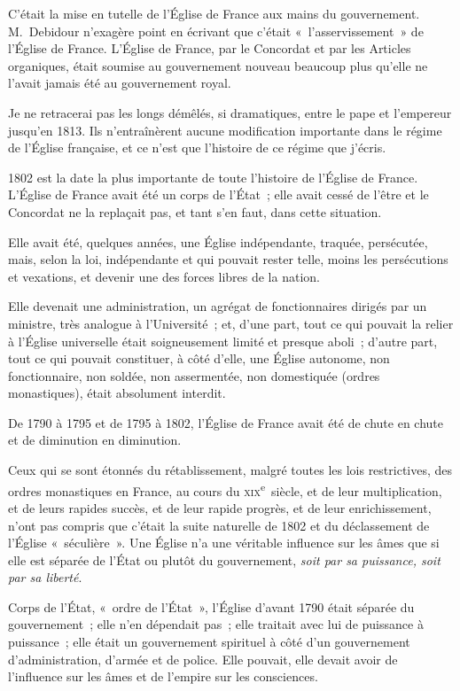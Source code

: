 \documentclass[french,twoside]{book} %
\begin{document}
C’était la mise en tutelle de l’Église de France aux mains du gouvernement. M. Debidour n’exagère point en écrivant que c’était « l’asservissement » de l’Église de France. L’Église de France, par le Concordat et par les Articles organiques, était soumise au gouvernement nouveau beaucoup plus qu’elle ne l’avait jamais été au gouvernement royal.\par
 Je ne retracerai pas les longs démêlés, si dramatiques, entre le pape et l’empereur jusqu’en 1813. Ils n’entraînèrent aucune modification importante dans le régime de l’Église française, et ce n’est que l’histoire de ce régime que j’écris.\par
1802 est la date la plus importante de toute l’histoire de l’Église de France. L’Église de France avait été un corps de l’État ; elle avait cessé de l’être et le Concordat ne la replaçait pas, et tant s’en faut, dans cette situation.\par
Elle avait été, quelques années, une Église indépendante, traquée, persécutée, mais, selon la loi, indépendante et qui pouvait rester telle, moins les persécutions et vexations, et devenir une des forces libres de la nation.\par
Elle devenait une administration, un agrégat de fonctionnaires dirigés par un ministre, très analogue à l’Université ; et, d’une part, tout ce qui pouvait la relier à l’Église universelle était soigneusement limité et presque aboli ; d’autre part, tout ce qui pouvait constituer, à côté d’elle, une Église autonome, non fonctionnaire, non soldée, non assermentée, non domestiquée (ordres monastiques), était absolument interdit.\par
De 1790 à 1795 et de 1795 à 1802, l’Église de France avait été de chute en chute et de diminution en diminution.\par
 Ceux qui se sont étonnés du rétablissement, malgré toutes les lois restrictives, des ordres monastiques en France, au cours du \textsc{xix}\textsuperscript{e} siècle, et de leur multiplication, et de leurs rapides succès, et de leur rapide progrès, et de leur enrichissement, n’ont pas compris que c’était la suite naturelle de 1802 et du déclassement de l’Église « séculière ». Une Église n’a une véritable influence sur les âmes que si elle est séparée de l’État ou plutôt du gouvernement, {\itshape soit par sa puissance, soit par sa liberté}.\par
Corps de l’État, « ordre de l’État », l’Église d’avant 1790 était séparée du gouvernement ; elle n’en dépendait pas ; elle traitait avec lui de puissance à puissance ; elle était un gouvernement spirituel à côté d’un gouvernement d’administration, d’armée et de police. Elle pouvait, elle devait avoir de l’influence sur les âmes et de l’empire sur les consciences.\par
\end{document}
